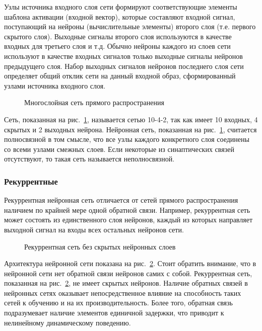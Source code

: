 Узлы источника входного слоя сети формируют соответствующие элементы шаблона активации (входной  вектор), которые составляют входной сигнал, поступающий на нейроны (вычислительные элементы) второго слоя (т.е. первого скрытого слоя).
Выходные сигналы второго слоя используются в качестве входных для третьего слоя и т.д.
Обычно нейроны каждого из слоев сети используют в качестве входных сигналов только выходные сигналы нейронов предыдущего слоя.
Набор выходных сигналов нейронов последнего слоя сети определяет общий отклик сети на данный входной образ, сформированный узлами источника входного слоя.

\begin{figure}[h]
\caption{Многослойная сеть прямого распространения}
\label{ris:ManyLayer}
\end{figure}

Сеть, показанная на рис.~\ref{ris:ManyLayer}, называется сетью 10-4-2, так как имеет 10 входных, 4 скрытых и 2 выходных нейрона.
Нейронная сеть, показанная на рис.~\ref{ris:ManyLayer}, считается полносвязной в том смысле, что все узлы каждого конкретного слоя соединены со всеми узлами смежных слоев.
Если некоторые из синаптических связей отсутствуют, то такая сеть называется неполносвязной.\cite{NejronnyeSeti}

\subsubsection{Рекуррентные}
Рекуррентная нейронная сеть отличается от сетей прямого распространения наличием по крайней мере одной обратной связи.
Например, рекуррентная сеть может состоять из единственного слоя нейронов, каждый из которых направляет выходной сигнал на входы всех остальных нейронов сети.

\begin{figure}[h]
\caption{Рекуррентная сеть без скрытых нейронных слоев}
\label{ris:Recurrent}
\end{figure}

Архитектура нейронной сети показана на рис.~\ref{ris:Recurrent}.
Стоит обратить внимание, что в нейронной сети нет обратной связи нейронов самих с собой.
Рекуррентная сеть, показанная на рис.~\ref{ris:Recurrent}, не имеет скрытых нейронов.
Наличие обратных связей в нейронных сетях оказывает непосредственное влияние на способность таких сетей к обучению и на их производительность.
Более того, обратная связь подразумевает наличие элементов единичной задержки, что приводит к нелинейному динамическому поведению.\cite{NejronnyeSeti}